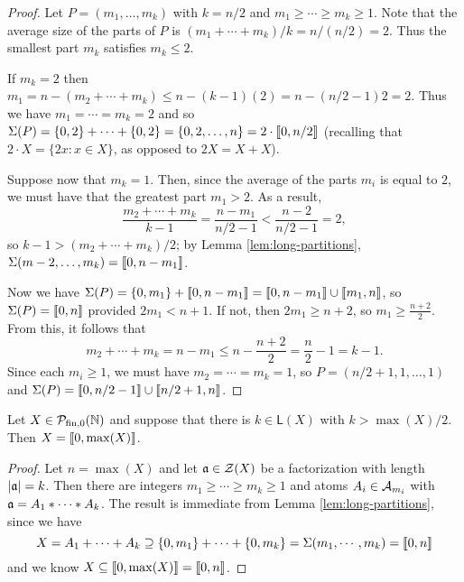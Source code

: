 \begin{proof}
	Let $P = (m_1,\dots, m_k)$ with $k=n/2$ and $m_1\ge \cdots \ge m_k \ge 1$.
	Note that the average size of the parts of $P$ is $(m_1+\cdots+m_k)/k = n/(n/2) = 2$.
	Thus the smallest part $m_k$ satisfies $m_k \le 2$.
	
	If $m_k = 2$ then $m_1 = n - (m_2+\cdots+m_k) \le n - (k-1)(2) = n - (n/2-1)2 = 2$.
	Thus we have $m_1 = \cdots = m_k = 2$ and so $\Sigma(P) = \{0,2\}+\cdots+\{0,2\} = \{0,2,\dots,n\} = 2\cdot\llb0,n/2\rrb$ (recalling that $2\cdot X = \{2x: x\in X\}$, as opposed to $2X = X+X$).
	
	Suppose now that $m_k=1$.
	Then, since the average of the parts $m_i$ is equal to $2$, we must have that the greatest part $m_1 > 2$.
	As a result, 
	\[\frac{m_2+\cdots+m_k}{k-1} = \frac{n-m_1}{n/2-1} < \frac{n-2}{n/2-1} = 2, \]
	so $k-1 > (m_2 + \cdots + m_k)/2$; by Lemma \ref{lem:long-partitions}, $\Sigma(m-2,\dots,m_k) = \llb 0, n-m_1 \rrb$.
	
	Now we have $\Sigma(P) = \{0,m_1\} + \llb 0,n-m_1\rrb = \llb 0,n-m_1 \rrb \cup \llb m_1, n\rrb$, so $\Sigma(P) = \llb 0,n \rrb$ provided $2m_1 < n+1$.
	If not, then $2m_1 \ge n+2$, so $m_1 \ge \frac{n+2}{2}$.
	From this, it follows that 
	\[m_2 +\cdots+m_k = n-m_1 \le n - \frac{n+2}{2} = \frac{n}{2}-1 = k-1.\]
	Since each $m_i \ge 1$, we must have $m_2 = \cdots = m_k = 1$, so $P = (n/2+1, 1,\dots, 1)$ and $\Sigma(P) = \llb 0,n/2-1 \rrb \cup \llb n/2+1,n\rrb$.
\end{proof}

\begin{thm}
	Let $X \in \PN$ and suppose that there is $k\in \mathsf{L}(X)$ with $k > \max(X)/2$.
	Then $X = \llb 0, \max(X) \rrb$.
\end{thm}

\begin{proof}
	Let $n = \max(X)$ and let $\aa\in\Z(X)$ be a factorization with length $|\aa| = k$.
	Then there are integers $m_1\ge\cdots \ge m_k \ge 1$ and atoms $A_i\in \A_{m_i}$ with $\aa = A_1*\cdots*A_k$.
	The result is immediate from Lemma \ref{lem:long-partitions}, since we have
	\[ X = A_1 + \cdots + A_k \supseteq \{0,m_1\} + \cdots + \{0,m_k\} = \Sigma(m_1,\cdots,m_k) = \llb 0,n \rrb \]
	and we know $X \subseteq \llb 0,\max(X) \rrb = \llb 0, n \rrb$.
\end{proof}
